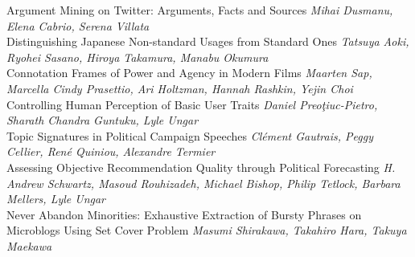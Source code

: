 \documentclass{book}
\begin{document}
    \noindent	Argument Mining on Twitter: Arguments, Facts and Sources \newline 
    {\itshape Mihai Dusmanu, Elena Cabrio, Serena Villata} \\
    
    \noindent	Distinguishing Japanese Non-standard Usages from Standard Ones \newline 
    {\itshape Tatsuya Aoki, Ryohei Sasano, Hiroya Takamura, Manabu Okumura} \\
    
    \noindent	Connotation Frames of Power and Agency in Modern Films \newline 
    {\itshape Maarten Sap, Marcella Cindy Prasettio, Ari Holtzman, Hannah Rashkin, Yejin Choi} \\
    
    \noindent	Controlling Human Perception of Basic User Traits \newline 
    {\itshape Daniel Preoţiuc-Pietro, Sharath Chandra Guntuku, Lyle Ungar} \\
    
    \noindent	Topic Signatures in Political Campaign Speeches \newline 
    {\itshape Clément Gautrais, Peggy Cellier, René Quiniou, Alexandre Termier} \\
    
    \noindent	Assessing Objective Recommendation Quality through Political Forecasting \newline 
    {\itshape H. Andrew Schwartz, Masoud Rouhizadeh, Michael Bishop, Philip Tetlock, Barbara Mellers, Lyle Ungar} \\
    
    \noindent	Never Abandon Minorities: Exhaustive Extraction of Bursty Phrases on Microblogs Using Set Cover Problem \newline 
    {\itshape Masumi Shirakawa, Takahiro Hara, Takuya Maekawa} \\
    
\end{document}
